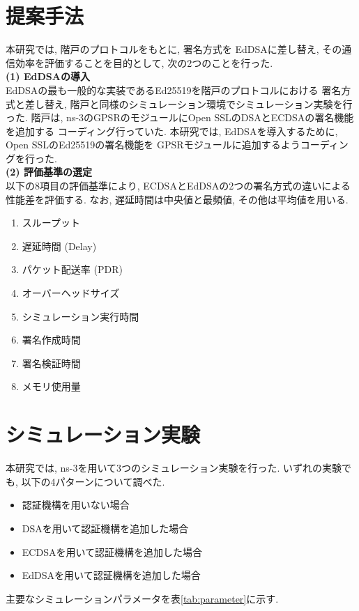 \documentclass[a4j,9pt,twocolumn]{jsarticle}
\begin{document}
\section{提案手法}
\indent 本研究では, 階戸のプロトコル\cite{shinato}をもとに, 署名方式を
EdDSAに差し替え, その通信効率を評価することを目的として, 次の2つのことを行った.\\ 
\noindent\textbf{(1) EdDSAの導入}\\
\indent EdDSAの最も一般的な実装であるEd25519を階戸のプロトコルにおける
署名方式と差し替え, 階戸と同様のシミュレーション環境でシミュレーション実験を行った. 
階戸は, ns-3のGPSRのモジュールにOpen SSLのDSAとECDSAの署名機能を追加する
コーディング行っていた. 本研究では, EdDSAを導入するために, Open SSLのEd25519の署名機能を
GPSRモジュールに追加するようコーディングを行った. \\
\noindent\textbf{(2) 評価基準の選定}\\
\indent 以下の8項目の評価基準により, ECDSAとEdDSAの2つの署名方式の違いによる
性能差を評価する.  なお, 遅延時間は中央値と最頻値, その他は平均値を用いる.
\vspace{-3mm}
\setlength{\columnsep}{10pt} %
\begin{multicols}{2}
    \begin{enumerate}
        \item スループット 
        \item 遅延時間 (Delay)
        \item パケット配送率 (PDR)
        \item オーバーヘッドサイズ\\
        \item シミュレーション実行時間
        \item 署名作成時間
        \item 署名検証時間
        \item メモリ使用量
    \end{enumerate}
\end{multicols}
\vspace{-3mm}
\section{シミュレーション実験}
\indent 本研究では, ns-3を用いて3つのシミュレーション実験を行った.  
いずれの実験でも, 以下の4パターンについて調べた. 
\begin{itemize}
    \item 認証機構を用いない場合
    \item DSAを用いて認証機構を追加した場合
    \item ECDSAを用いて認証機構を追加した場合
    \item EdDSAを用いて認証機構を追加した場合
\end{itemize}
\indent 主要なシミュレーションパラメータを表\ref{tab:parameter}に示す. 
\end{document}
